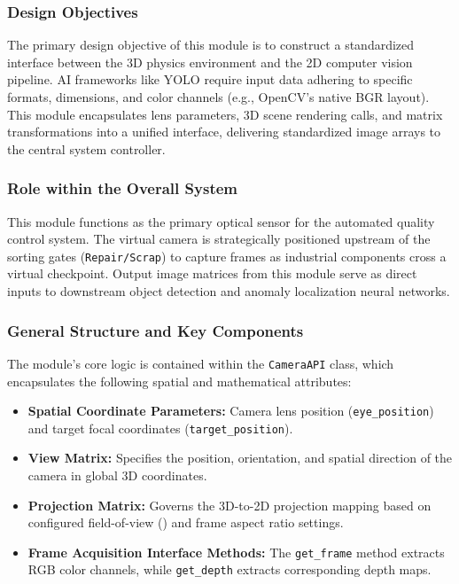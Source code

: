 \documentclass{article}
\begin{document}
\subsubsection{Design Objectives}
The primary design objective of this module is to construct a standardized interface between the 3D physics environment and the 2D computer vision pipeline. AI frameworks like YOLO require input data adhering to specific formats, dimensions, and color channels (e.g., OpenCV's native BGR layout). This module encapsulates lens parameters, 3D scene rendering calls, and matrix transformations into a unified interface, delivering standardized image arrays to the central system controller.

\subsubsection{Role within the Overall System}
This module functions as the primary optical sensor for the automated quality control system. The virtual camera is strategically positioned upstream of the sorting gates (\texttt{Repair/Scrap}) to capture frames as industrial components cross a virtual checkpoint. Output image matrices from this module serve as direct inputs to downstream object detection and anomaly localization neural networks.

\subsubsection{General Structure and Key Components}
The module's core logic is contained within the \texttt{CameraAPI} class, which encapsulates the following spatial and mathematical attributes:

\begin{itemize}
	\item \textbf{Spatial Coordinate Parameters:} Camera lens position (\texttt{eye\_position}) and target focal coordinates (\texttt{target\_position}).
	\item \textbf{View Matrix:} Specifies the position, orientation, and spatial direction of the camera in global 3D coordinates.
	\item \textbf{Projection Matrix:} Governs the 3D-to-2D projection mapping based on configured field-of-view () and frame aspect ratio settings.
	\item \textbf{Frame Acquisition Interface Methods:} The \texttt{get\_frame} method extracts RGB color channels, while \texttt{get\_depth} extracts corresponding depth maps.
\end{itemize}
\end{document}
